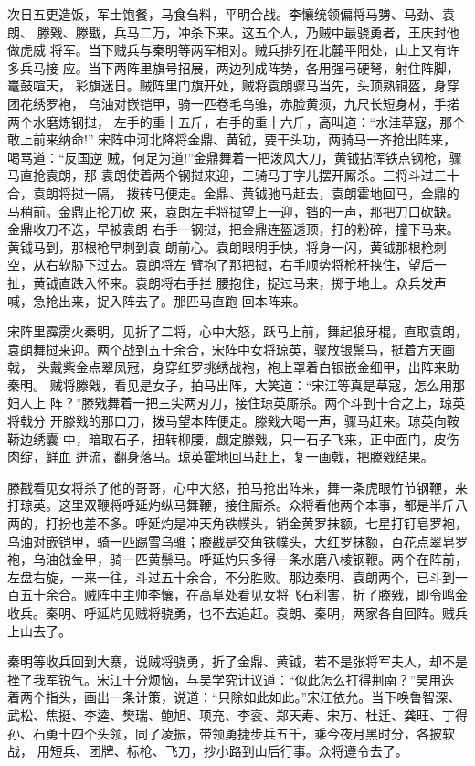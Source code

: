 次日五更造饭，军士饱餐，马食刍料，平明合战。李懹统领偏将马勥、马劲、袁朗、
滕戣、滕戡，兵马二万，冲杀下来。这五个人，乃贼中最骁勇者，王庆封他做虎威
将军。当下贼兵与秦明等两军相对。贼兵排列在北麓平阳处，山上又有许多兵马接
应。当下两阵里旗号招展，两边列成阵势，各用强弓硬弩，射住阵脚，鼍鼓喧天，
彩旗迷日。贼阵里门旗开处，贼将袁朗骤马当先，头顶熟铜盔，身穿团花绣罗袍，
乌油对嵌铠甲，骑一匹卷毛乌骓，赤脸黄须，九尺长短身材，手掿两个水磨炼钢挝，
左手的重十五斤，右手的重十六斤，高叫道：“水洼草寇，那个敢上前来纳命!”
宋阵中河北降将金鼎、黄钺，要干头功，两骑马一齐抢出阵来，喝骂道：“反国逆
贼，何足为道!”金鼎舞着一把泼风大刀，黄钺拈浑铁点钢枪，骤马直抢袁朗，那
袁朗使着两个钢挝来迎，三骑马丁字儿摆开厮杀。三将斗过三十合，袁朗将挝一隔，
拨转马便走。金鼎、黄钺驰马赶去，袁朗霍地回马，金鼎的马稍前。金鼎正抡刀砍
来，袁朗左手将挝望上一迎，铛的一声，那把刀口砍缺。金鼎收刀不迭，早被袁朗
右手一钢挝，把金鼎连盔透顶，打的粉碎，撞下马来。黄钺马到，那根枪早刺到袁
朗前心。袁朗眼明手快，将身一闪，黄钺那根枪刺空，从右软胁下过去。袁朗将左
臂抱了那把挝，右手顺势将枪杆挟住，望后一扯，黄钺直跌入怀来。袁朗将右手拦
腰抱住，捉过马来，掷于地上。众兵发声喊，急抢出来，捉入阵去了。那匹马直跑
回本阵来。

宋阵里霹雳火秦明，见折了二将，心中大怒，跃马上前，舞起狼牙棍，直取袁朗，
袁朗舞挝来迎。两个战到五十余合，宋阵中女将琼英，骤放银鬃马，挺着方天画戟，
头戴紫金点翠凤冠，身穿红罗挑绣战袍，袍上罩着白银嵌金细甲，出阵来助秦明。
贼将滕戣，看见是女子，拍马出阵，大笑道：“宋江等真是草寇，怎么用那妇人上
阵？”滕戣舞着一把三尖两刃刀，接住琼英厮杀。两个斗到十合之上，琼英将戟分
开滕戣的那口刀，拨马望本阵便走。滕戣大喝一声，骤马赶来。琼英向鞍鞒边绣囊
中，暗取石子，扭转柳腰，觑定滕戣，只一石子飞来，正中面门，皮伤肉绽，鲜血
迸流，翻身落马。琼英霍地回马赶上，复一画戟，把滕戣结果。

滕戡看见女将杀了他的哥哥，心中大怒，拍马抢出阵来，舞一条虎眼竹节钢鞭，来
打琼英。这里双鞭将呼延灼纵马舞鞭，接住厮杀。众将看他两个本事，都是半斤八
两的，打扮也差不多。呼延灼是冲天角铁幞头，销金黄罗抹额，七星打钉皂罗袍，
乌油对嵌铠甲，骑一匹踢雪乌骓；滕戡是交角铁幞头，大红罗抹额，百花点翠皂罗
袍，乌油戗金甲，骑一匹黄鬃马。呼延灼只多得一条水磨八棱钢鞭。两个在阵前，
左盘右旋，一来一往，斗过五十余合，不分胜败。那边秦明、袁朗两个，已斗到一
百五十余合。贼阵中主帅李懹，在高阜处看见女将飞石利害，折了滕戣，即令鸣金
收兵。秦明、呼延灼见贼将骁勇，也不去追赶。袁朗、秦明，两家各自回阵。贼兵
上山去了。

秦明等收兵回到大寨，说贼将骁勇，折了金鼎、黄钺，若不是张将军夫人，却不是
挫了我军锐气。宋江十分烦恼，与吴学究计议道：“似此怎么打得荆南？”吴用迭
着两个指头，画出一条计策，说道：“只除如此如此。”宋江依允。当下唤鲁智深、
武松、焦挺、李逵、樊瑞、鲍旭、项充、李衮、郑天寿、宋万、杜迁、龚旺、丁得
孙、石勇十四个头领，同了凌振，带领勇捷步兵五千，乘今夜月黑时分，各披软战，
用短兵、团牌、标枪、飞刀，抄小路到山后行事。众将遵令去了。

